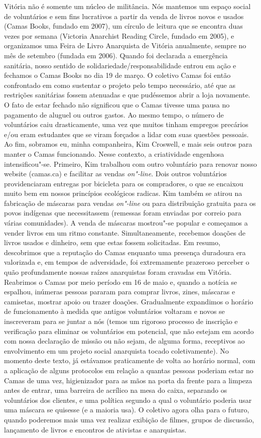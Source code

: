 Vitória não é somente um núcleo de militância. Nós mantemos um espaço
social de voluntários e sem fins lucrativos a partir da venda de livros
novos e usados (Camas Books, fundado em 2007), um círculo de leitura que
se encontra duas vezes por semana (Victoria Anarchist Reading Circle,
fundado em 2005), e organizamos uma Feira de Livro Anarquista de Vitória
anualmente, sempre no mês de setembro (fundada em 2006). Quando foi
declarada a emergência sanitária, nosso sentido de
solidariedade/responsabilidade entrou em ação e fechamos o Camas Books
no dia 19 de março. O coletivo Camas foi então confrontado em como
sustentar o projeto pelo tempo necessário, até que as restrições
sanitárias fossem atenuadas e que pudéssemos abrir a loja novamente. O
fato de estar fechado não significou que o Camas tivesse uma pausa no
pagamento de aluguel ou outros gastos. Ao mesmo tempo, o número de
voluntários caiu drasticamente, uma vez que muitos tinham empregos
precários e/ou eram estudantes que se viram forçados a lidar com suas
questões pessoais. Ao fim, sobramos eu, minha companheira, Kim Croswell,
e mais seis outros para manter o Camas funcionando. Nesse contexto, a
criatividade engenhosa intensificou"-se. Primeiro, Kim trabalhou com
outro voluntário para renovar nosso website (camas.ca) e facilitar as
vendas \emph{on"-line}. Dois outros voluntários providenciaram entregas
por bicicleta para os compradores, o que se encaixou muito bem em nossos
princípios ecológicos radicas. Kim também se atirou na fabricação de
máscaras para vendas \emph{on"-line} ou para distribuição gratuita para
os povos indígenas que necessitassem (remessas foram enviadas por
correio para várias comunidades). A venda de máscaras mostrou"-se popular
e começamos a vender livros em um ritmo constante. Simultaneamente,
recebemos doações de livros usados e dinheiro, sem que estas fossem
solicitadas. Em resumo, descobrimos que a reputação do Camas enquanto
uma presença duradoura era valorizada e, em tempos de adversidade, foi
extremamente prazeroso perceber o quão profundamente nossas raízes
anarquistas foram cravadas em Vitória. Reabrimos o Camas por meio
período em 16 de maio e, quando a notícia se espalhou, inúmeras pessoas
pararam para comprar livros, zines, máscaras e camisetas, mostrar apoio
ou trazer doações. Gradualmente expandimos o horário de funcionamento à
medida que antigos voluntários voltaram e novos se inscreveram para se
juntar a nós (temos um rigoroso processo de inscrição e verificação para
eliminar os voluntários em potencial, que não estejam em acordo com
nossa declaração de missão ou não sejam, de alguma forma, receptivos ao
envolvimento em um projeto social anarquista tocado coletivamente). No
momento deste texto, já estávamos praticamente de volta ao horário
normal, com a aplicação de alguns protocolos em relação a quantas
pessoas poderiam estar no Camas de uma vez, higienizador para as mãos na
porta da frente para a limpeza antes de entrar, uma barreira de acrílico
na mesa do caixa, separando os voluntários dos clientes, e uma política
segundo a qual o voluntário poderia usar uma máscara se quisesse (e a
maioria usa). O coletivo agora olha para o futuro, quando poderemos mais
uma vez realizar exibição de filmes, grupos de discussão, lançamento de
livros e encontros de ativistas e anarquistas.

